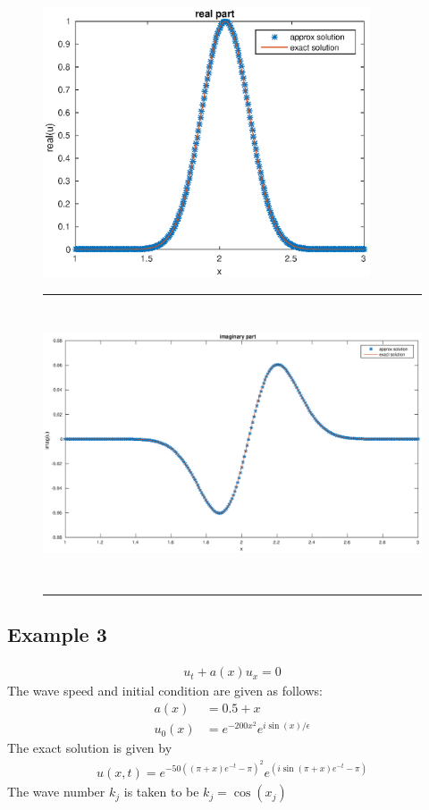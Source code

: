 \begin{figure}[htbp]
	\centering
		\includegraphics[height=8cm]{Figures/real_RCTFPM3_1.eps}\\
		\rule{35em}{0.5pt}
	\caption[RCTFPM Real part]{}
\end{figure}
\begin{figure}[htbp]
	\centering
		\includegraphics[height=8cm]{Figures/imag_RCTFPM3_1.eps}\\
		\rule{35em}{0.5pt}
	\caption[RCTFPM Real part]{}
\end{figure}
\clearpage
\subsection{Example 3}
\begin{align}
 u_{t} + a(x)u_{x} = 0
\end{align}
The wave speed and initial condition are given as follows:
\begin{align}
 a(x) &= 0.5 + x\\
 u_{0}(x) &= e^{-200x^2}e^{i\sin(x)/\epsilon}
\end{align}
The exact solution is given by
\begin{align}
 u(x,t) = e^{-50((\pi+x)e^{-t}-\pi)^2}e^{(i\sin(\pi+x)e^{-t}-\pi)}
\end{align}
The wave number $k_{j}$ is taken to be $k_{j}=\cos(x_{j})$

